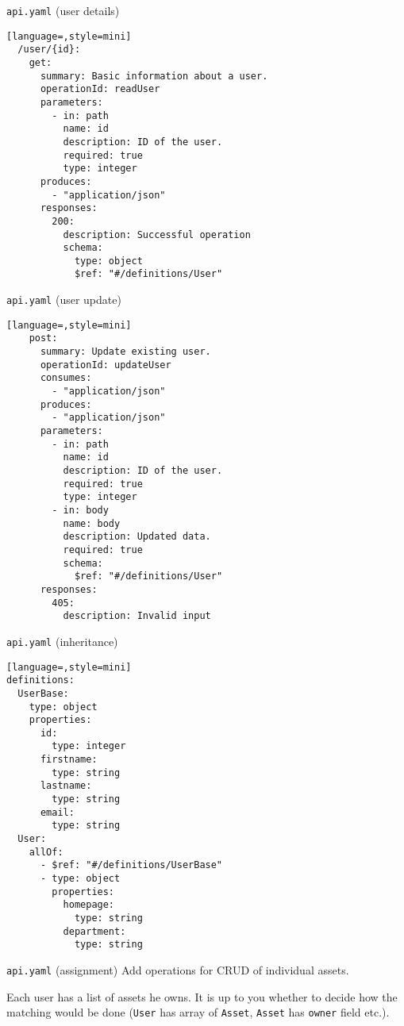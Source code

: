 \begin{frame}[fragile]{\texttt{api.yaml} (user details)}
\begin{lstlisting}[language=,style=mini]
  /user/{id}:
    get:
      summary: Basic information about a user.
      operationId: readUser
      parameters:
        - in: path
          name: id
          description: ID of the user.
          required: true
          type: integer
      produces:
        - "application/json"
      responses:
        200:
          description: Successful operation
          schema:
            type: object
            $ref: "#/definitions/User"
\end{lstlisting}
\end{frame}

\begin{frame}[fragile]{\texttt{api.yaml} (user update)}
\begin{lstlisting}[language=,style=mini]
    post:
      summary: Update existing user.
      operationId: updateUser
      consumes:
        - "application/json"
      produces:
        - "application/json"
      parameters:
        - in: path
          name: id
          description: ID of the user.
          required: true
          type: integer
        - in: body
          name: body
          description: Updated data.
          required: true
          schema:
            $ref: "#/definitions/User"
      responses:
        405:
          description: Invalid input
\end{lstlisting}
\end{frame}


\begin{frame}[fragile]{\texttt{api.yaml} (inheritance)}
\begin{lstlisting}[language=,style=mini]
definitions:
  UserBase:
    type: object
    properties:
      id:
        type: integer
      firstname:
        type: string
      lastname:
        type: string
      email:
        type: string
  User:
    allOf:
      - $ref: "#/definitions/UserBase"
      - type: object
        properties:
          homepage:
            type: string
          department:
            type: string
\end{lstlisting}
\end{frame}


\begin{frame}[fragile]{\texttt{api.yaml} (assignment)}
    Add operations for CRUD of individual assets.
    
    \medskip
    
    Each user has a list of assets he owns.
    It is up to you whether to decide how the matching
    would be done (\texttt{User} has array of \texttt{Asset},
    \texttt{Asset} has \texttt{owner} field etc.).
\end{frame}


